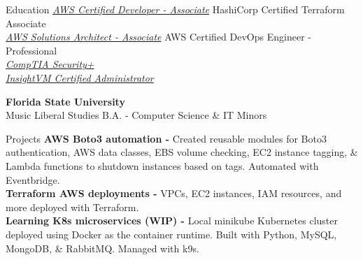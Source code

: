 \documentclass{resume} %
\begin{document}
{\begin{rSection}{Education}
		{\color{cyan}
			\href{https://www.credly.com/badges/b9878dcd-04a3-477f-85fc-27daa383e4de}
			{\em AWS Certified Developer - Associate}} \hfill HashiCorp Certified Terraform Associate\\ %
		{\color{cyan}
			\href{https://www.credly.com/badges/e2e9fabd-695d-4bb0-aa74-737fbebd64c9}
			{\em AWS Solutions Architect - Associate}} \hfill AWS Certified DevOps Engineer - Professional \\ %
		{\color{cyan}
			\href{https://www.credly.com/badges/fb3524b2-ef52-4c7b-9854-e00dd92e7046}
			{\em CompTIA Security+}}\\ %
		{\color{cyan}
			\href{https://verify.skilljar.com/c/sxetfkgywaqn}
			{\em InsightVM Certified Administrator}}%
		\begin{center}
			{\bf Florida State University}\\ %
			Music Liberal Studies B.A. - Computer Science \& IT Minors\end{center}
		\vspace{-4ex}
	\end{rSection}

	\begin{rSection}{Projects}
		{\bf AWS Boto3 automation \enspace - \enspace }Created reusable modules for Boto3 authentication, AWS data classes, EBS volume checking, EC2 instance tagging, \& Lambda functions to shutdown instances based on tags. Automated with Eventbridge.\\
		{\bf Terraform AWS deployments \enspace - \enspace } VPCs, EC2 instances, IAM resources, and more deployed with Terraform.\\
		{\bf Learning K8s microservices (WIP) \enspace - \enspace } Local minikube Kubernetes cluster deployed using Docker as the container runtime. Built with Python, MySQL, MongoDB, \& RabbitMQ. Managed with k9s.\\
	\end{rSection}
	
	}
\end{document}
